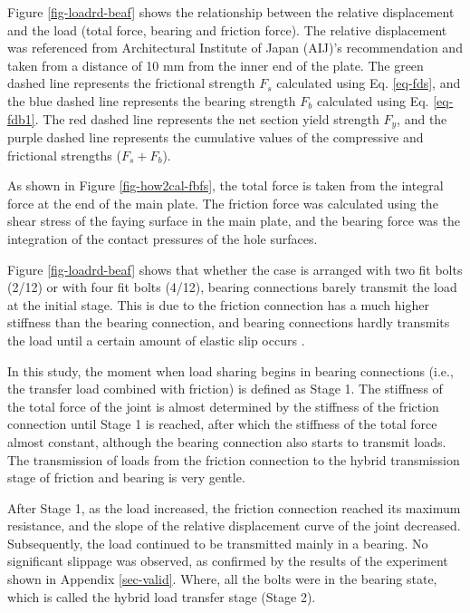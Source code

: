 Figure \ref{fig-loadrd-beaf} shows the relationship between the relative displacement and the load (total force, bearing and friction force). The relative displacement was referenced from Architectural Institute of Japan (AIJ)'s \cite{AIJ2012AIJStructures} recommendation and taken from a distance of 10 mm from the inner end of the plate. The green dashed line represents the frictional strength $F_s$ calculated using Eq. \ref{eq-fds}, and the blue dashed line represents the bearing strength $F_b$ calculated using Eq. \ref{eq-fdb1}. The red dashed line represents the net section yield strength $F_y$, and the purple dashed line represents the cumulative values of the compressive and frictional strengths ($F_s+F_b$).

As shown in Figure \ref{fig-how2cal-fbfs}, the total force is taken from the integral force at the end of the main plate. The friction force was calculated using the shear stress of the faying surface in the main plate, and the bearing force was the integration of the contact pressures of the hole surfaces.

Figure \ref{fig-loadrd-beaf} shows that whether the case is arranged with two fit bolts (2/12) or with four fit bolts (4/12), bearing connections barely transmit the load at the initial stage. This is due to the friction connection has a much higher stiffness than the bearing connection, and bearing connections hardly transmits the load until a certain amount of elastic slip occurs \cite{fisher1965behavior,Chen2023MechanicalConnections,chen_experimental_2024}. 

In this study, the moment when load sharing begins in bearing connections (i.e., the transfer load combined with friction) is defined as Stage 1. The stiffness of the total force of the joint is almost determined by the stiffness of the friction connection until Stage 1 is reached, after which the stiffness of the total force almost constant, although the bearing connection also starts to transmit loads. The transmission of loads from the friction connection to the hybrid transmission stage of friction and bearing is very gentle. 

After Stage 1, as the load increased, the friction connection reached its maximum resistance, and the slope of the relative displacement curve of the joint decreased. Subsequently, the load continued to be transmitted mainly in a bearing. No significant slippage was observed, as confirmed by the results of the experiment \cite{chen_experimental_2024} shown in Appendix \ref{sec-valid}. Where, all the bolts were in the bearing state, which is called the hybrid load transfer stage (Stage 2).

